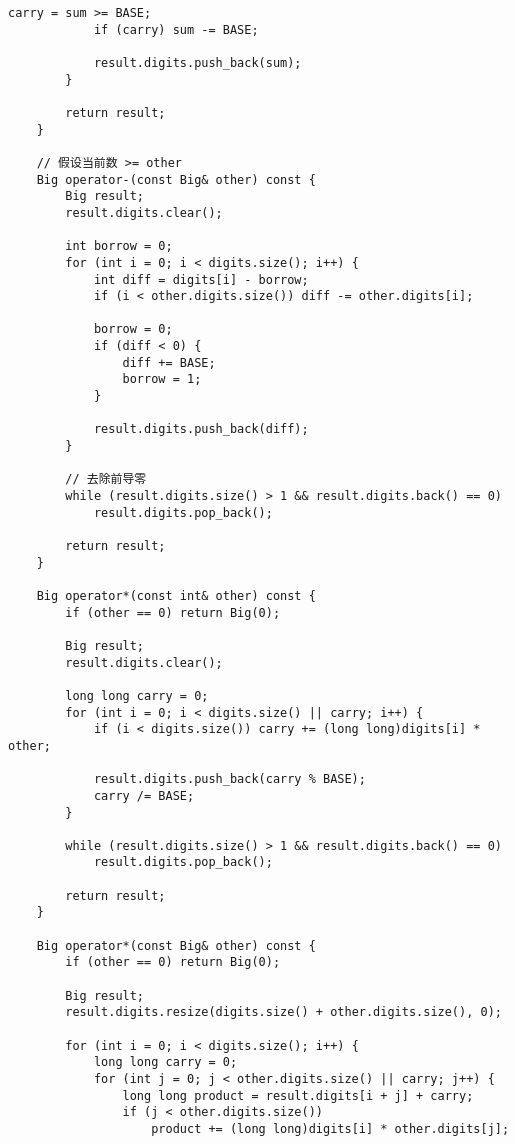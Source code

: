 \documentclass[UTF8]{article}
\begin{document}
\begin{lstlisting}[caption=压位高精度类]
            carry = sum >= BASE;
            if (carry) sum -= BASE;
            
            result.digits.push_back(sum);
        }
        
        return result;
    }

    // 假设当前数 >= other
    Big operator-(const Big& other) const {
        Big result;
        result.digits.clear();
        
        int borrow = 0;
        for (int i = 0; i < digits.size(); i++) {
            int diff = digits[i] - borrow;
            if (i < other.digits.size()) diff -= other.digits[i];
            
            borrow = 0;
            if (diff < 0) {
                diff += BASE;
                borrow = 1;
            }
            
            result.digits.push_back(diff);
        }
        
        // 去除前导零
        while (result.digits.size() > 1 && result.digits.back() == 0)
            result.digits.pop_back();
        
        return result;
    }

    Big operator*(const int& other) const {
        if (other == 0) return Big(0);
        
        Big result;
        result.digits.clear();
        
        long long carry = 0;
        for (int i = 0; i < digits.size() || carry; i++) {
            if (i < digits.size()) carry += (long long)digits[i] * other;
            
            result.digits.push_back(carry % BASE);
            carry /= BASE;
        }
        
        while (result.digits.size() > 1 && result.digits.back() == 0)
            result.digits.pop_back();
            
        return result;
    }

    Big operator*(const Big& other) const {
        if (other == 0) return Big(0);
        
        Big result;
        result.digits.resize(digits.size() + other.digits.size(), 0);
        
        for (int i = 0; i < digits.size(); i++) {
            long long carry = 0;
            for (int j = 0; j < other.digits.size() || carry; j++) {
                long long product = result.digits[i + j] + carry;
                if (j < other.digits.size()) 
                    product += (long long)digits[i] * other.digits[j];
                

\end{lstlisting}
\end{document}
